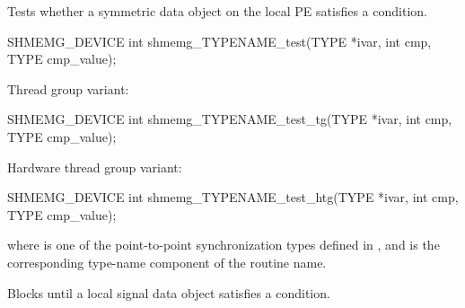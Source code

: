 \label{subsec:gc_test}

Tests whether a symmetric data object on the local \ac{PE} satisfies a
condition.

\begin{apidefinition}
\begin{Csynopsis}
SHMEMG_DEVICE int shmemg_TYPENAME_test(TYPE *ivar, int cmp, TYPE cmp_value);
\end{Csynopsis}

Thread group variant:
\begin{CsynopsisCol}
SHMEMG_DEVICE int shmemg_TYPENAME_test_tg(TYPE *ivar, int cmp, TYPE cmp_value);
\end{CsynopsisCol}

Hardware thread group variant:
\begin{CsynopsisCol}
SHMEMG_DEVICE int shmemg_TYPENAME_test_htg(TYPE *ivar, int cmp, TYPE cmp_value);
\end{CsynopsisCol}

where \TYPE{} is one of the point-to-point synchronization types defined in
, and \TYPENAME{} is the corresponding type-name component of the
routine name.

\begin{apiarguments}
\end{apiarguments}


\end{apidefinition}

\label{subsec:gc_signal_wait_until}

Blocks until a local signal data object satisfies a condition.

